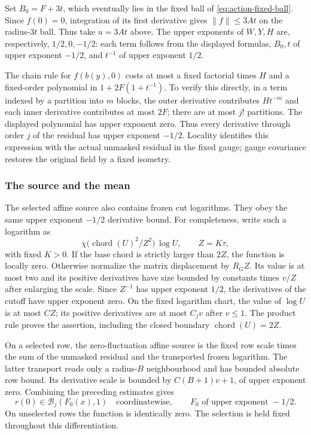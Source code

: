 Set $B_0=F+3t$, which eventually lies in the fixed ball of
\eqref{eq:action-fixed-ball}. Since $f(0)=0$, integration of its
first derivative gives $\|f\|\le3At$ on the radius-$3t$ ball.
Thus take $u=3At$ above. The upper exponents of $W,Y,H$ are,
respectively, $1/2,0,-1/2$: each term follows from the displayed
formulas, $B_0,t$ of upper exponent $-1/2$, and $t^{-1}$ of
upper exponent $1/2$.

The chain rule for $f(b(y),0)$ costs at most a fixed factorial
times $H$ and a fixed-order polynomial in
$1+2F(1+t^{-1})$. To verify this directly, in a term indexed by a
partition into $m$ blocks, the outer derivative contributes
$Ht^{-m}$ and each inner derivative contributes at most $2F$;
there are at most $j!$ partitions. The displayed polynomial has
upper exponent zero. Thus every derivative through order $j$ of
the residual has upper exponent $-1/2$. Locality identifies this
expression with the actual unmasked residual in the fixed gauge;
gauge covariance restores the original field by a fixed isometry.

\subsubsection{The source and the mean}
The selected affine source also contains frozen cut logarithms.
They obey the same upper exponent $-1/2$ derivative bound. For
completeness, write such a logarithm as
\[
 \chi\bigl(\operatorname{chord}(U)^2/Z^2\bigr)\,
                    \log U,
 \qquad Z=K\tau,
\]
with fixed $K>0$. If the base chord is strictly larger than $2Z$,
the function is locally zero. Otherwise normalize the matrix
displacement by $R_GZ$. Its value is at most two and its positive
derivatives have size bounded by constants times $v/Z$ after
enlarging the scale. Since $Z^{-1}$ has upper exponent $1/2$,
the derivatives of the cutoff have upper exponent zero. On the
fixed logarithm chart, the value of $\log U$ is at most $C Z$;
its positive derivatives are at most $C_jv$ after $v\le1$.
The product rule proves the assertion, including the closed
boundary $\operatorname{chord}(U)=2Z$.

On a selected row, the zero-fluctuation affine source is the fixed
row scale times the sum of the unmasked residual and the transported
frozen logarithm. The latter transport reads only a radius-$B$
neighbourhood and has bounded absolute row bound. Its derivative
scale is bounded by $C(B+1)v+1$, of upper exponent zero. Combining
the preceding estimates gives
\begin{equation}\label{eq:action-source-jets}
 r(0)\in\mathcal B_j(F_0(x),1)
 \quad\text{coordinatewise},\qquad F_0\text{ of upper exponent }-1/2.
\end{equation}
On unselected rows the function is identically zero. The selection
is held fixed throughout this differentiation.

